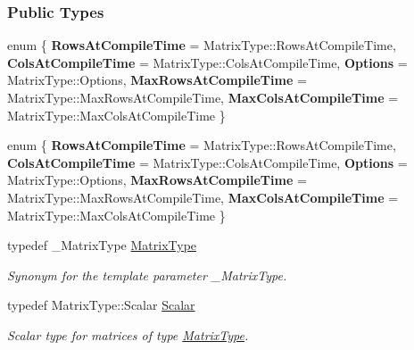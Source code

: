 \subsubsection*{Public Types}
\begin{DoxyCompactItemize}
\item 
\mbox{\label{group___eigenvalues___module_adb0de94b5b6578036638a93e726771c6}} 
enum \{ \newline
{\bfseries Rows\+At\+Compile\+Time} = Matrix\+Type\+:\+:Rows\+At\+Compile\+Time, 
{\bfseries Cols\+At\+Compile\+Time} = Matrix\+Type\+:\+:Cols\+At\+Compile\+Time, 
{\bfseries Options} = Matrix\+Type\+:\+:Options, 
{\bfseries Max\+Rows\+At\+Compile\+Time} = Matrix\+Type\+:\+:Max\+Rows\+At\+Compile\+Time, 
\newline
{\bfseries Max\+Cols\+At\+Compile\+Time} = Matrix\+Type\+:\+:Max\+Cols\+At\+Compile\+Time
 \}
\item 
\mbox{\label{group___eigenvalues___module_a02c0f322aae862d4368b8a4aff848d43}} 
enum \{ \newline
{\bfseries Rows\+At\+Compile\+Time} = Matrix\+Type\+:\+:Rows\+At\+Compile\+Time, 
{\bfseries Cols\+At\+Compile\+Time} = Matrix\+Type\+:\+:Cols\+At\+Compile\+Time, 
{\bfseries Options} = Matrix\+Type\+:\+:Options, 
{\bfseries Max\+Rows\+At\+Compile\+Time} = Matrix\+Type\+:\+:Max\+Rows\+At\+Compile\+Time, 
\newline
{\bfseries Max\+Cols\+At\+Compile\+Time} = Matrix\+Type\+:\+:Max\+Cols\+At\+Compile\+Time
 \}
\item 
\mbox{\label{group___eigenvalues___module_ad61f6278843a601096276c9a72c0252f}} 
typedef \+\_\+\+Matrix\+Type \hyperlink{group___eigenvalues___module_ad61f6278843a601096276c9a72c0252f}{Matrix\+Type}
\begin{DoxyCompactList}\small\item\em Synonym for the template parameter {\ttfamily \+\_\+\+Matrix\+Type}. \end{DoxyCompactList}\item 
\mbox{\label{group___eigenvalues___module_a61035d40c9498bb1d47628cdd4946785}} 
typedef Matrix\+Type\+::\+Scalar \hyperlink{group___eigenvalues___module_a61035d40c9498bb1d47628cdd4946785}{Scalar}
\begin{DoxyCompactList}\small\item\em Scalar type for matrices of type \hyperlink{group___eigenvalues___module_ad61f6278843a601096276c9a72c0252f}{Matrix\+Type}. \end{DoxyCompactList}\item 

\end{DoxyCompactItemize}
